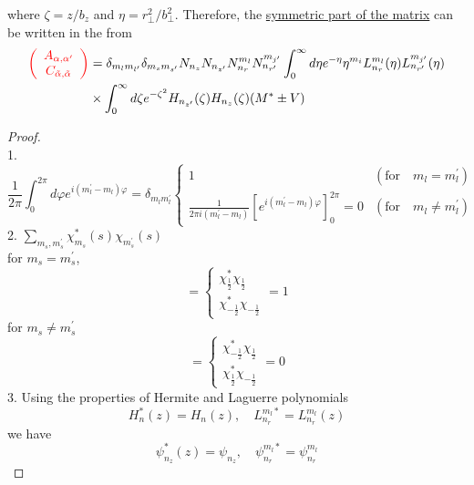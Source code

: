 where $\zeta = z/b_z$ and $\eta = r_{\perp}^2/b_{\perp}^2$. Therefore, the \underline{symmetric part of the matrix} can be written in the from
\begin{equation}
\begin{aligned}
  \textcolor{red}{\left(\begin{array}{c}
    A_{\alpha, \alpha^{\prime}} \\
    C_{\tilde{\alpha}, \tilde{\alpha}}
  \end{array}\right)} &=\delta_{m_{l} m_{l^{\prime}}} \delta_{m_{s} m_{s^{\prime}}} N_{n_{z}} N_{n_{z^{\prime}}} N_{n_{r}}^{m_{l}} N_{n_{r^{\prime}}}^{m_{j^{\prime}}} \int_{0}^{\infty} d \eta e^{-\eta} \eta^{m_{i}} L_{n_{r}}^{m_{l}}(\eta) L_{n_{r^{\prime}}}^{m_{j^{\prime}}}(\eta) \\
  & \times \int_{0}^{\infty} d \zeta e^{-\zeta^{2}} H_{n_{z^{\prime}}}(\zeta) H_{n_{z}}(\zeta)(M^\ast \pm V)
\end{aligned}
\end{equation}
\begin{proof}
\\1. 
\begin{equation}
  \frac{1}{2\pi} \int_{0}^{2\pi} d\varphi e^{i(m_l^{\prime} - m_l)\varphi} = \delta_{m_l m_l^{\prime}}
  \begin{cases}
    1 & (\text{for} \quad m_l = m_l^{\prime})  \\
    \frac{1}{2\pi i(m_l^{\prime} - m_l)} \left[e^{i(m_l^{\prime} -m_l) \varphi}\right]_0^{2\pi}= 0 & (\text{for} \quad m_l \neq m_l^{\prime})
  \end{cases}
\end{equation}
2. $\sum_{m_s, m_{s}^\prime} \chi_{m_s}^{\ast}(s)\chi_{m_s^{\prime}}(s)$\\
for $m_s = m_s^{\prime}$,
\begin{equation}
  =
  \begin{cases}
    \chi_{\frac{1}{2}}^{\ast}\chi_{\frac{1}{2}} \\
    \chi_{-\frac{1}{2}}^{\ast}\chi_{-\frac{1}{2}}
  \end{cases}
  =1
\end{equation}
for $m_s \neq m_s^{\prime}$
\begin{equation}
  =
  \begin{cases}
    \chi_{-\frac{1}{2}}^{\ast}\chi_{\frac{1}{2}} \\
    \chi_{\frac{1}{2}}^{\ast}\chi_{-\frac{1}{2}}
  \end{cases}
  =0
\end{equation}
3. Using the properties of Hermite and Laguerre polynomials
\begin{equation*}
  H_n^{\ast}(z) = H_n(z), \quad L_{n_r}^{m_l\ast} = L_{n_r}^{m_l}(z)
\end{equation*}
we have
\begin{equation*}
  \psi_{n_z}^{\ast}(z) = \psi_{n_z}, \quad \psi_{n_r}^{m_l\ast} = \psi_{n_r}^{m_l} 
\end{equation*}
\end{proof}

